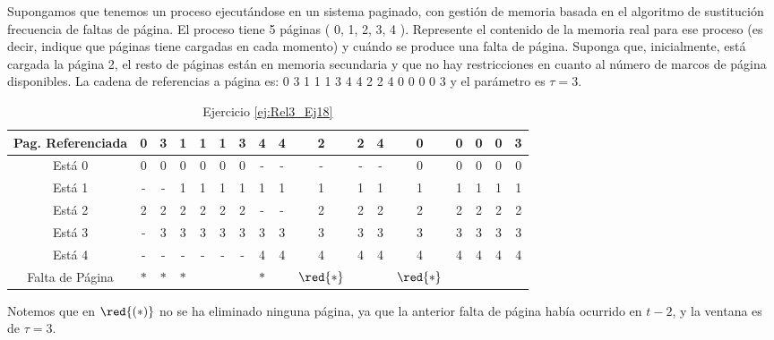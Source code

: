 \begin{ejercicio} \label{ej:Rel3_Ej18}
    Supongamos que tenemos un proceso ejecutándose en un sistema paginado, con
gestión de memoria basada en el algoritmo de sustitución frecuencia de faltas de
página. El proceso tiene 5 páginas ( 0, 1, 2, 3, 4 ). Represente el contenido de la
memoria real para ese proceso (es decir, indique que páginas tiene cargadas en cada
momento) y cuándo se produce una falta de página. Suponga que, inicialmente, está
cargada la página 2, el resto de páginas están en memoria secundaria y que no hay
restricciones en cuanto al número de marcos de página disponibles. La cadena de
referencias a página es: 0 3 1 1 1 3 4 4 2 2 4 0 0 0 0 3 y el parámetro es $\tau=3$.

    \begin{table}[H]
        \centering
        \begin{tabular}{|c|c|c|c|c|c|c|c|c|c|c|c|c|c|c|c|c|}
            Pag. Referenciada & 0 & 3 & 1 & 1 & 1 & 3 & 4 & 4 & 2 & 2 & 4 & 0 & 0 & 0 & 0 & 3 \\ \hline \hline
            Está 0            & 0 & 0 & 0 & 0 & 0 & 0 & - & - & - & - & - & 0 & 0 & 0 & 0 & 0 \\ \hline
            Está 1            & - & - & 1 & 1 & 1 & 1 & 1 & 1 & 1 & 1 & 1 & 1 & 1 & 1 & 1 & 1 \\ \hline
            Está 2            & 2 & 2 & 2 & 2 & 2 & 2 & - & - & 2 & 2 & 2 & 2 & 2 & 2 & 2 & 2 \\ \hline
            Está 3            & - & 3 & 3 & 3 & 3 & 3 & 3 & 3 & 3 & 3 & 3 & 3 & 3 & 3 & 3 & 3 \\ \hline
            Está 4            & - & - & - & - & - & - & 4 & 4 & 4 & 4 & 4 & 4 & 4 & 4 & 4 & 4 \\ \hline \hline
            Falta de Página   & $\ast$ & $\ast$ & $\ast$ &   &   &   & $\ast$ &   & $\red{\ast}$ &   &   & $\red{\ast}$ &   &   &   & 
        \end{tabular}
        \caption{Ejercicio \ref{ej:Rel3_Ej18}}
        \label{tab:Rel3_Ej18}
    \end{table}

    Notemos que en $\red{(\ast)}$ no se ha eliminado ninguna página, ya que la anterior falta de página había ocurrido en $t-2$,
    y la ventana es de $\tau=3$.
\end{ejercicio}



